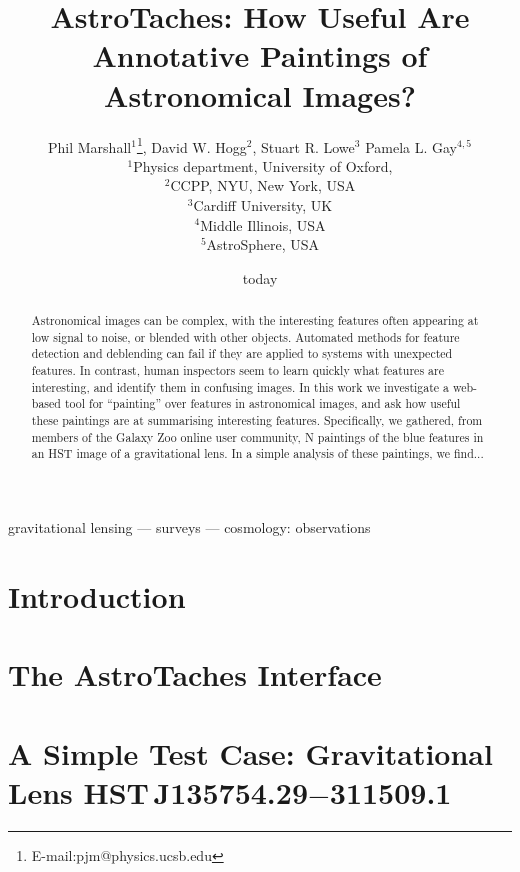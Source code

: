 \documentclass[useAMS,usenatbib]{mn2e}
\title%
[Astronomical Image Annotation]%
{AstroTaches: How Useful Are Annotative Paintings of Astronomical Images?}
\author%
[Marshall et al]%
{Phil Marshall$^{1}$\thanks{E-mail:pjm@physics.ucsb.edu}, 
David W. Hogg$^{2}$,
Stuart R. Lowe$^{3}$
\newauthor Pamela L. Gay$^{4,5}$\\
$^{1}$Physics department, University of Oxford, \\
$^{2}$CCPP, NYU, New York, USA\\
$^{3}$Cardiff University, UK\\
$^{4}$Middle Illinois, USA\\
$^{5}$AstroSphere, USA}
\date{today}
\def\lens{HST\,J135754.29$-$311509.1}
\begin{document}
\maketitle


\begin{abstract}

Astronomical images can be complex, with the interesting features often
appearing at low signal to noise, or blended with other objects. Automated
methods for feature detection and deblending can fail if they are applied to
systems with unexpected features. In contrast,  human inspectors seem to learn
quickly what features are interesting, and identify them in confusing images.
In this work we investigate a web-based tool for ``painting'' over features in
astronomical images, and ask how useful these paintings are at summarising
interesting features. Specifically, we gathered, from members of the Galaxy
Zoo online user community, N paintings of the blue features in an HST image of
a gravitational lens. In a simple analysis of these paintings, we find...

\end{abstract}


\begin{keywords}
gravitational lensing --- surveys --- cosmology: observations
\end{keywords}



\section{Introduction}



\section{The AstroTaches Interface}
\label{sect:interface}




\section{A Simple Test Case: Gravitational Lens \lens}
\label{sect:testcase}
\end{document}
